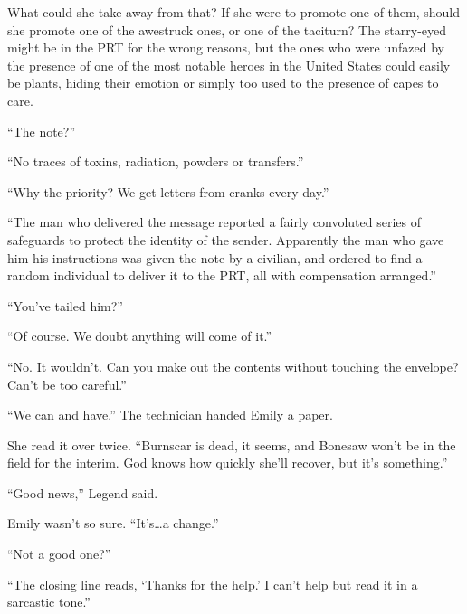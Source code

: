 What could she take away from that?  If she were to promote one of them, should she promote one of the awestruck ones, or one of the taciturn?  The starry-eyed might be in the PRT for the wrong reasons, but the ones who were unfazed by the presence of one of the most notable heroes in the United States could easily be plants, hiding their emotion or simply too used to the presence of capes to care.



``The note?''



``No traces of toxins, radiation, powders or transfers.''



``Why the priority?  We get letters from cranks every day.''



``The man who delivered the message reported a fairly convoluted series of safeguards to protect the identity of the sender.  Apparently the man who gave him his instructions was given the note by a civilian, and ordered to find a random individual to deliver it to the PRT, all with compensation arranged.''



``You've tailed him?''



``Of course.  We doubt anything will come of it.''



``No.  It wouldn't.  Can you make out the contents without touching the envelope?  Can't be too careful.''



``We can and have.''  The technician handed Emily a paper.



She read it over twice.  ``Burnscar is dead, it seems, and Bonesaw won't be in the field for the interim.  God knows how quickly she'll recover, but it's something.''



``Good news,'' Legend said.



Emily wasn't so sure.  ``It's\ldots a change.''



``Not a good one?''



``The closing line reads, `Thanks for the help.'  I can't help but read it in a sarcastic tone.''



